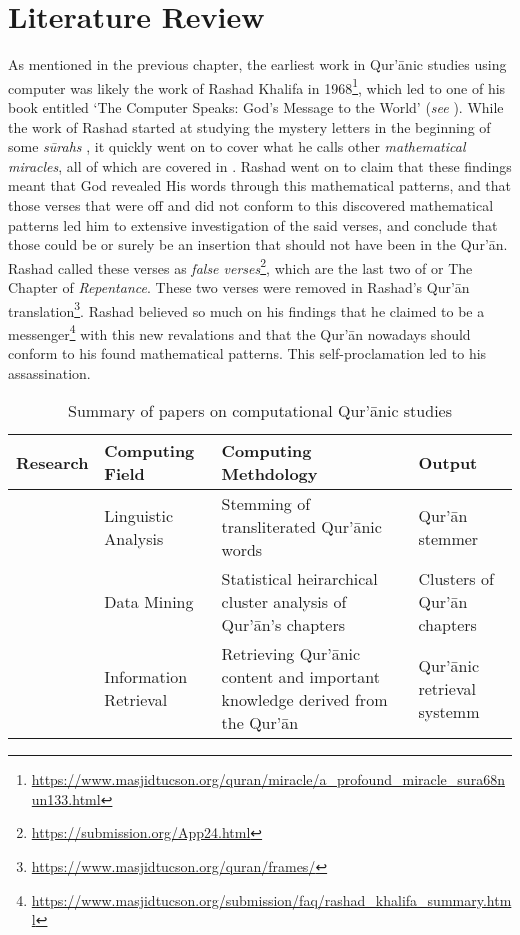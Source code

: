 \chapter{Literature Review}

As mentioned in the previous chapter, the earliest work in Qur'\=anic studies using computer was likely the work of Rashad Khalifa in 1968\footnote{\url{https://www.masjidtucson.org/quran/miracle/a_profound_miracle_sura68nun133.html}}, which led to one of his book entitled `The Computer Speaks: God's Message to the World' (\textit{see} ). While the work of Rashad started at studying the mystery letters in the beginning of some \textit{s\=urahs} , it quickly went on to cover what he calls other \textit{mathematical miracles}, all of which are covered in . Rashad went on to claim that these findings meant that God revealed His words through this mathematical patterns, and that those verses that were off and did not conform to this discovered mathematical patterns led him to extensive investigation of the said verses, and conclude that those could be or surely be an insertion that should not have been in the Qur'\=an. Rashad called these verses as \textit{false verses}\footnote{\url{https://submission.org/App24.html}}, which are the last two   of   or The Chapter of \textit{Repentance}. These two verses were removed in Rashad's Qur'\=an translation\footnote{\url{https://www.masjidtucson.org/quran/frames/}}. Rashad believed so much on his findings that he claimed to be a messenger\footnote{\url{https://www.masjidtucson.org/submission/faq/rashad_khalifa_summary.html}} with this new revalations and that the Qur'\=an nowadays should conform to his found mathematical patterns. This self-proclamation led to his assassination.

\begin{table}[!h]
    \caption{Summary of papers on computational Qur'\=anic studies}
    \begin{tabularx}{\textwidth}{YYYY}
        \toprule
        \textbf{Research} & \textbf{Computing Field} &\textbf{Computing Methdology} & \textbf{Output}\\\midrule
        &Linguistic Analysis &Stemming of transliterated Qur'\=anic words&Qur'\=an stemmer\\
        &Data Mining&Statistical heirarchical cluster analysis of Qur'\=an's chapters&Clusters of Qur'\=an chapters\\
        &Information Retrieval&Retrieving Qur'\=anic content and important knowledge derived from the Qur'\=an& Qur'\=anic retrieval systemm\\
        \bottomrule
    \end{tabularx}
    \label{tab:single_ave}
\end{table}


